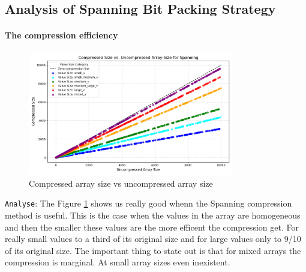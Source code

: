 \documentclass[11pt, a4paper]{article}
\begin{document}
	\subsection{Analysis of Spanning Bit Packing Strategy}
	\label{sec:strategy_analysis}
	
	
	\paragraph{The compression efficiency}
	
	\begin{figure}[H]%
		\centering
		\includegraphics[width=0.8\textwidth]{Grafics/Spanning/Spanningefficency.png}
		\caption{Compressed array size vs uncompressed array size}
		\label{fig:12}
	\end{figure}
	
	\texttt{Analyse}: The Figure \ref{fig:12} shows us really good whenn the Spanning compression method is useful. This is the case when the values in the array are homogeneous and then the smaller these values are the more efficent the compression get. For really small values to a third of its original size and for large values only to 9/10 of its original size. The important thing to state out is that for mixed arrays the compression is marginal. At small array sizes even inexistent.
	
\end{document}
